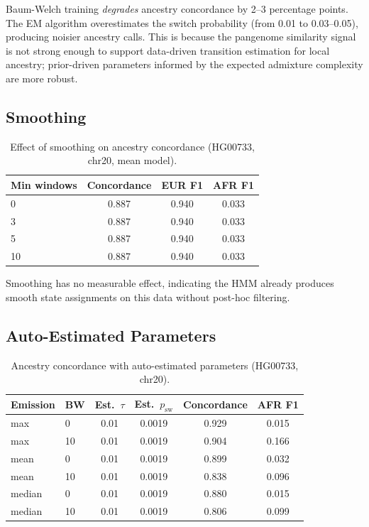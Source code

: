 \documentclass[11pt]{article}
\begin{document}
Baum-Welch training \emph{degrades} ancestry concordance by 2--3 percentage points. The EM algorithm overestimates the switch probability (from 0.01 to 0.03--0.05), producing noisier ancestry calls. This is because the pangenome similarity signal is not strong enough to support data-driven transition estimation for local ancestry; prior-driven parameters informed by the expected admixture complexity are more robust.

\subsection{Smoothing}

\begin{table}[ht]
\centering
\caption{Effect of smoothing on ancestry concordance (HG00733, chr20, mean model).}
\label{tab:smoothing_sensitivity}
\begin{tabular}{lccc}
\hline
\textbf{Min windows} & \textbf{Concordance} & \textbf{EUR F1} & \textbf{AFR F1} \\
\hline
0 & 0.887 & 0.940 & 0.033 \\
3 & 0.887 & 0.940 & 0.033 \\
5 & 0.887 & 0.940 & 0.033 \\
10 & 0.887 & 0.940 & 0.033 \\
\hline
\end{tabular}
\end{table}

Smoothing has no measurable effect, indicating the HMM already produces smooth state assignments on this data without post-hoc filtering.

\subsection{Auto-Estimated Parameters}

\begin{table}[ht]
\centering
\caption{Ancestry concordance with auto-estimated parameters (HG00733, chr20).}
\label{tab:ancestry_auto}
\begin{tabular}{llcccc}
\hline
\textbf{Emission} & \textbf{BW} & \textbf{Est.\ $\tau$} & \textbf{Est.\ $p_{\text{sw}}$} & \textbf{Concordance} & \textbf{AFR F1} \\
\hline
max & 0 & 0.01 & 0.0019 & 0.929 & 0.015 \\
max & 10 & 0.01 & 0.0019 & 0.904 & 0.166 \\
mean & 0 & 0.01 & 0.0019 & 0.899 & 0.032 \\
mean & 10 & 0.01 & 0.0019 & 0.838 & 0.096 \\
median & 0 & 0.01 & 0.0019 & 0.880 & 0.015 \\
median & 10 & 0.01 & 0.0019 & 0.806 & 0.099 \\
\hline
\end{tabular}
\end{table}
\end{document}
